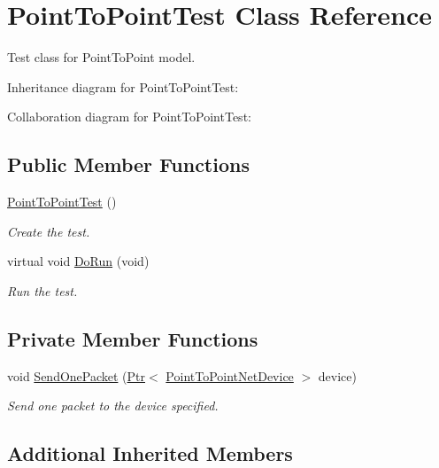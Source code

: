 \hypertarget{classPointToPointTest}{}\section{Point\+To\+Point\+Test Class Reference}
\label{classPointToPointTest}


Test class for Point\+To\+Point model.  




Inheritance diagram for Point\+To\+Point\+Test\+:


Collaboration diagram for Point\+To\+Point\+Test\+:
\subsection*{Public Member Functions}
\begin{DoxyCompactItemize}
\item 
\hyperlink{classPointToPointTest_a3af806f53d0aa2057df7d9acf3ac7ef7}{Point\+To\+Point\+Test} ()
\begin{DoxyCompactList}\small\item\em Create the test. \end{DoxyCompactList}\item 
virtual void \hyperlink{classPointToPointTest_afd738a4b03ad89822e12e898cc1b09df}{Do\+Run} (void)
\begin{DoxyCompactList}\small\item\em Run the test. \end{DoxyCompactList}\end{DoxyCompactItemize}
\subsection*{Private Member Functions}
\begin{DoxyCompactItemize}
\item 
void \hyperlink{classPointToPointTest_a62dc99f3a74b830a62d00355801636e9}{Send\+One\+Packet} (\hyperlink{classns3_1_1Ptr}{Ptr}$<$ \hyperlink{classns3_1_1PointToPointNetDevice}{Point\+To\+Point\+Net\+Device} $>$ device)
\begin{DoxyCompactList}\small\item\em Send one packet to the device specified. \end{DoxyCompactList}\end{DoxyCompactItemize}
\subsection*{Additional Inherited Members}


